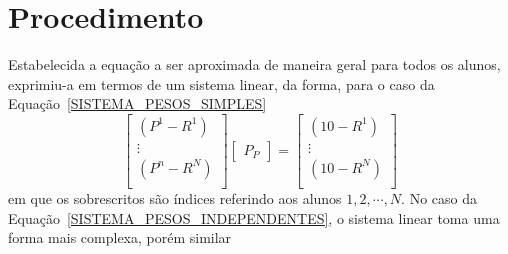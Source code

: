 \documentclass[11pt]{article}
\begin{document}
        \section{Procedimento}
                Estabelecida a equação a ser aproximada de
                maneira geral para todos os alunos, exprimiu-a
                em termos de um sistema linear, da forma,
                para o caso da
                Equação~\ref{SISTEMA_PESOS_SIMPLES}
                \begin{equation}
                        \begin{bmatrix}
                                (P^1 - R^1) \\
                                \vdots      \\
                                (P^n - R^N) \\
                        \end{bmatrix}
                        \begin{bmatrix}
                                P_P
                        \end{bmatrix}
                        =
                        \begin{bmatrix}
                                (10 - R^1) \\
                                \vdots      \\
                                (10 - R^N) \\
                        \end{bmatrix}
                        \label{LINEAR_PESOS_SIMPLES}
                \end{equation}
                em que os sobrescritos são índices referindo
                aos alunos $1,2,\cdots,N$. No caso da
                Equação~\ref{SISTEMA_PESOS_INDEPENDENTES},
                o sistema linear toma uma forma mais
                complexa, porém similar
\end{document}
